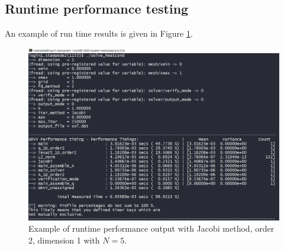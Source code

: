 \documentclass[12pt]{amsart}   %
\begin{document}
\subsection{Runtime performance testing}
An example of run time results is given in Figure \ref{fig:9}.
\begin{figure}[htbp!]
\centering
    \includegraphics[width=1.3\linewidth]{Project1photos/withoutdebug_verify.png}
    \caption{Example of runtime performance output with Jacobi method, order 2, dimension 1 with $N=5$.}
    \label{fig:9}
\end{figure}
\end{document}
